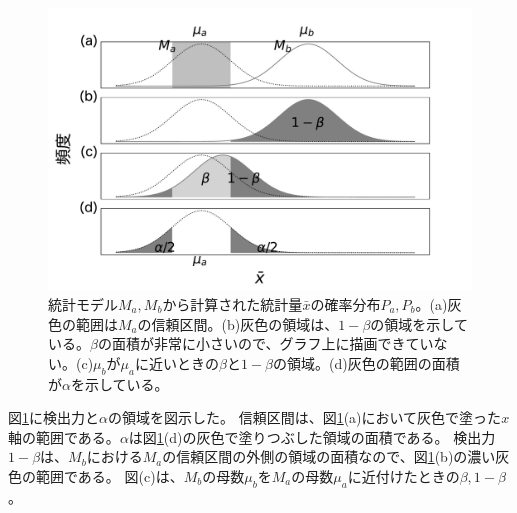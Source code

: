 \begin{figure}
\begin{center}
 \includegraphics[width=15cm]{./image/04_/power_of_a_test_2.pdf}
 \caption{統計モデル$M_a,M_b$から計算された統計量$\bar{x}$の確率分布$P_a,P_b$。(a)灰色の範囲は$M_a$の信頼区間。(b)灰色の領域は、$1-\beta$の領域を示している。$\beta$の面積が非常に小さいので、グラフ上に描画できていない。(c)$\mu_b$が$\mu_a$に近いときの$\beta$と$1-\beta$の領域。(d)灰色の範囲の面積が$\alpha$を示している。}
 \label{fig:power_of_test_alpha_beta}
\end{center}
\end{figure}


図\ref{fig:power_of_test_alpha_beta}に検出力と$\alpha$の領域を図示した。
信頼区間は、図\ref{fig:power_of_test_alpha_beta}(a)において灰色で塗った$x$軸の範囲である。$\alpha$は図\ref{fig:power_of_test_alpha_beta}(d)の灰色で塗りつぶした領域の面積である。
検出力$1-\beta$は、$M_b$における$M_a$の信頼区間の外側の領域の面積なので、図\ref{fig:power_of_test_alpha_beta}(b)の濃い灰色の範囲である。
図\label{fig:power_of_test_alpha_beta}(c)は、$M_b$の母数$\mu_b$を$M_a$の母数$\mu_a$に近付けたときの$\beta,1-\beta$。



